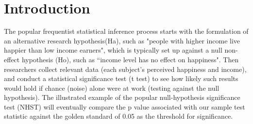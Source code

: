 \documentclass[inte,nonblindrev]{informs3} %
\begin{document}
%


\section{Introduction}

The popular frequentist statistical inference process starts with the formulation of an alternative research hypothesis(Ha), such as "people with higher income live happier than low income earners", which is typically set up against a null non-effect hypothesis (Ho), such as ``income level has no effect on happiness". Then researchers collect relevant data (each subject's perceived happiness and income), and conduct a statistical significance test (t test) to see how likely such results would hold if chance (noise) alone were at work (testing against the null hypothesis). The illustrated example of the popular null-hypothesis significance test (NHST) will eventually compare the p value associated with our sample test statistic against the golden standard of 0.05 as the threshold for significance. 
\end{document}
